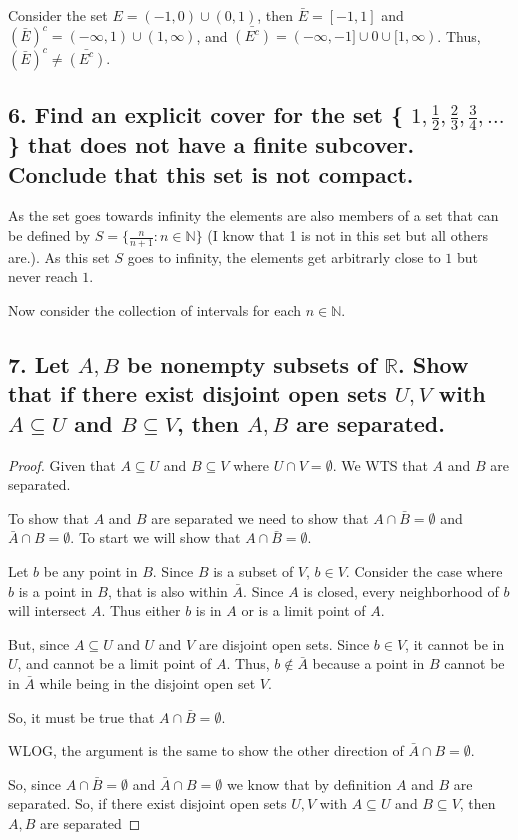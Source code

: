 \documentclass{article}
\begin{document}
Consider the set $E = (-1,0) \cup (0,1)$, then $\bar{E} = [-1,1]$ and $( \bar{E} )^c = (- \infty, 1) \cup (1, \infty)$, and $\bar{(E^c)} =(-\infty, -1]
 \cup {0} \cup [1,\infty)$. Thus, $( \bar{E} )^c \ne \bar{(E^c)}$.

\subsection*{6. Find an explicit cover for the set \{ $1, \frac{1}{2}, \frac{2}{3}, \frac{3}{4}, \ldots $ \} that does not have a finite subcover. Conclude that this set is not compact.}

As the set goes towards infinity the elements are also members of a set that can be defined by $S = \{\frac{n}{n+1} : n \in \mathbb{N}\}$ (I know that 1 is not in this set but all others are.). 
As this set $S$ goes to infinity, the elements get arbitrarly close to $1$ but never reach $1$. 

Now consider the collection of intervals for each $n \in \mathbb{N}$. 


\subsection*{7. Let $A,B$ be nonempty subsets of $\mathbb{R}$. Show that if there exist disjoint open sets $U, V$ with $A \subseteq U$ and $B \subseteq V$, then $A,B$ are separated.}

\begin{proof}

Given that $A \subseteq U$ and $B \subseteq V$ where $U \cap V = \emptyset$. We WTS that $A$ and $B$ are separated.

To show that $A$ and $B$ are separated we need to show that $A \cap \bar{B} = \emptyset$ and $\bar{A} \cap B = \emptyset$. To start we will show that 
$A \cap \bar{B} = \emptyset$.

Let $b$ be any point in $B$. Since $B$ is a subset of $V$, $b \in V$. Consider the case where $b$ is a point in $B$, that is also within $\bar{A}$. Since $A$ 
is closed, every neighborhood of $b$ will intersect $A$. Thus either $b$ is in $A$ or is a limit point of $A$.

But, since $A \subseteq U$ and $U$ and $V$ are disjoint open sets. Since $b \in V$, it cannot be in $U$, and cannot be a limit point of $A$. Thus, $b \notin \bar{A}$ because a point in $B$ 
cannot be in $\bar{A}$ while being in the disjoint open set $V$.

So, it must be true that $A \cap \bar{B} = \emptyset$.

WLOG, the argument is the same to show the other direction of $\bar{A} \cap B = \emptyset$.

So, since $A \cap \bar{B} = \emptyset$ and $\bar{A} \cap B = \emptyset$ we know that by definition $A$ and $B$ are separated. So, if there exist disjoint open sets $U, V$ with $A \subseteq U$ and $B \subseteq V$, then $A,B$ are separated

\end{proof}
\end{document}

